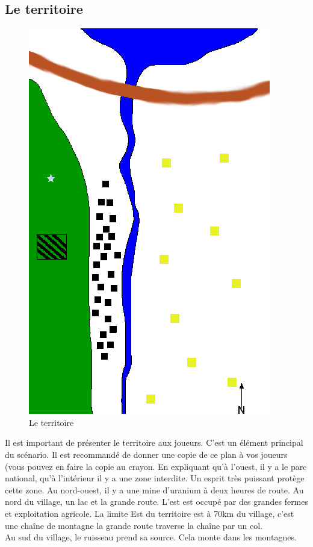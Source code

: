 \documentclass[oneside,12pt]{book}
\begin{document}
\begin{flushleft}
\subsection{Le territoire}
\begin{figure}[!ht]
\caption{\label{territoire} Le territoire}
\includegraphics[scale=0.8]{plan.png}
\end{figure}
Il est important de présenter le territoire aux joueurs.
C'est un élément principal du scénario. Il est recommandé de donner une copie de ce plan à vos joueurs (vous pouvez en faire la copie au crayon. En expliquant qu'à l'ouest, il y a le parc national, qu'à l'intérieur il y a une zone interdite. Un esprit très puissant protège cette zone. Au nord-ouest, il y a une mine d'uranium à deux heures de route. Au nord du village, un lac et la grande route. L'est est occupé par des grandes fermes et exploitation agricole. La limite Est du territoire est à 70km du  village, c'est une chaîne de montagne la grande route traverse la chaîne par un col. \\
Au sud du village, le ruisseau prend sa source. Cela monte dans les montagnes. \\


\end{flushleft}
\end{document}
